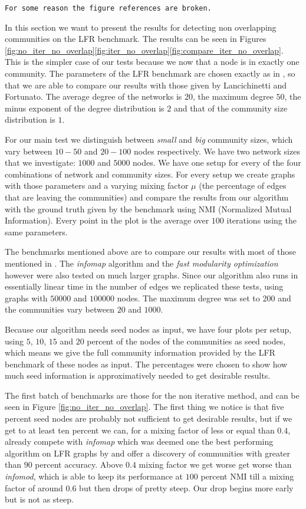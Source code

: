 \texttt{For some reason the figure references are broken.}

In this section we want to present the results for detecting non overlapping communities on the LFR benchmark. The results can be seen in Figures \ref{fig:no_iter_no_overlap}\ref{fig:iter_no_overlap}\ref{fig:compare_iter_no_overlap}. This is the simpler case of our tests because we now that a node is in exactly one community. The parameters of the LFR benchmark are chosen exactly as in \cite{LF09}, so that we are able to compare our results with those given by Lancichinetti and Fortunato. The average degree of the networks is $20$, the maximum degree $50$, the minus exponent of the degree distribution is $2$ and that of the community size distribution is $1$.

For our main test we distinguish between \textit{small} and \textit{big} community sizes, which vary between $10 - 50$ and $20 - 100$ nodes respectively. We have two network sizes that we investigate: $1000$ and $5000$ nodes. We have one setup for every of the four combinations of network and community sizes. For every setup we create graphs with those parameters and a varying mixing factor $\mu$ (the percentage of edges that are leaving the communities) and compare the results from our algorithm with the ground truth given by the benchmark using NMI (Normalized Mutual Information). Every point in the plot is the average over $100$ iterations using the same parameters. 

The benchmarks mentioned above are to compare our results with most of those mentioned in \cite{LF09}. The \textit{infomap} algorithm \cite{RB08} and the \textit{fast modularity optimization} \cite{BGLL08} however were also tested on much larger graphs.
Since our algorithm also runs in essentially linear time in the number of edges we replicated these tests, using graphs with $50000$ and $100000$ nodes. The maximum degree was set to $200$ and the communities vary between $20$ and $1000$.

Because our algorithm needs seed nodes as input, we have four plots per setup, using $5$, $10$, $15$ and $20$ percent of the nodes of the communities as seed nodes, which means we give the full community information provided by the LFR benchmark of these nodes as input. The percentages were chosen to show how much seed information is approximatively needed to get desirable results.

The first batch of benchmarks are those for the non iterative method, and can be seen in Figure \ref{fig:no_iter_no_overlap}. The first thing we notice is that five percent seed nodes are probably not sufficient to get desirable results, but if we get to at least ten percent we can, for a mixing factor of less or equal than $0.4$, already compete with \textit{infomap} which was deemed one the best performing algorithm on LFR graphs by \cite{LF09} and offer a discovery of communities with greater than $90$ percent accuracy. Above $0.4$ mixing factor we get worse get worse than \textit{infomod}, which is able to keep its performance at $100$ percent NMI till a mixing factor of around $0.6$ but then drops of pretty steep. Our drop begins more early but is not as steep.

